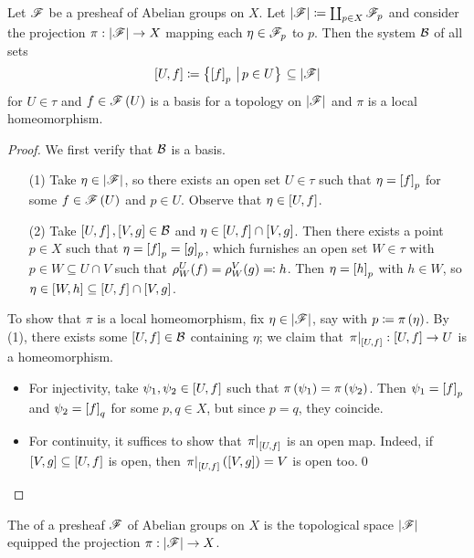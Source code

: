 \documentclass[../Moduli_Spaces_of_Riemann_Surfaces.tex]{subfiles}
\begin{document}
    \begin{proposition}\label{CS:prp:basis_stalk}
        Let $\mathscr{F}$ be a presheaf of Abelian groups on $X$. Let $\left|\mathscr{F}\right|\coloneqq\coprod_{p\in X}\mathscr{F}_p$ and consider the projection $\pi:\left|\mathscr{F}\right|\to X$ mapping each $\eta\in\mathscr{F}_p$ to $p$. Then the system $\mathcal{B}$ of all sets
        \begin{equation*}
            \left[U,f\right]\coloneqq\bigl\{\left[f\right]_p\,\left|\,p\in U\bigr\}\right.\subseteq\left|\mathscr{F}\right|
        \end{equation*}
        for $U\in\tau$ and $f\in\mathscr{F}\left(U\right)$ is a basis for a topology on $\left|\mathscr{F}\right|$ and $\pi$ is a local homeomorphism.
    \end{proposition}
    \begin{proof}
        We first verify that $\mathcal{B}$ is a basis.
        \begin{enumerate}
            \item[(1)] Take $\eta\in\left|\mathscr{F}\right|$, so there exists an open set $U\in\tau$ such that $\eta=\left[f\right]_p$ for some $f\in\mathscr{F}\left(U\right)$ and $p\in U$. Observe that $\eta\in\left[U,f\right]$.
            \item[(2)] Take $\left[U,f\right],\left[V,g\right]\in\mathcal{B}$ and $\eta\in\left[U,f\right]\cap\left[V,g\right]$. Then there exists a point $p\in X$ such that $\eta=\left[f\right]_p=\left[g\right]_p$, which furnishes an open set $W\in\tau$ with $p\in W\subseteq U\cap V$ such that $\rho^U_W\!\left(f\right)=\rho^V_W\!\left(g\right)\eqqcolon h$. Then $\eta=\left[h\right]_p$ with $h\in W$, so $\eta\in\left[W,h\right]\subseteq\left[U,f\right]\cap\left[V,g\right]$.
        \end{enumerate}
        To show that $\pi$ is a local homeomorphism, fix $\eta\in\left|\mathscr{F}\right|$, say with $p\coloneqq\pi\left(\eta\right)$. By (1), there exists some $\left[U,f\right]\in\mathcal{B}$ containing $\eta$; we claim that $\left.\pi\right|_{\left[U,f\right]}:\left[U,f\right]\to U$ is a homeomorphism.
        \begin{itemize}
            \item For injectivity, take $\psi_1,\psi_2\in\left[U,f\right]$ such that $\pi\left(\psi_1\right)=\pi\left(\psi_2\right)$. Then $\psi_1=\left[f\right]_p$ and $\psi_2=\left[f\right]_q$ for some $p,q\in X$, but since $p=q$, they coincide.
            \item For continuity, it suffices to show that $\left.\pi\right|_{\left[U,f\right]}$ is an open map. Indeed, if $\left[V,g\right]\subseteq\left[U,f\right]$ is open, then $\left.\pi\right|_{\left[U,f\right]}\left(\left[V,g\right]\right)=V$ is open too.\qed
        \end{itemize}
    \end{proof}
    \begin{definition}
        The  of a presheaf $\mathscr{F}$ of Abelian groups on $X$ is the topological space $\left|\mathscr{F}\right|$ equipped the projection $\pi:\left|\mathscr{F}\right|\to X$.
    \end{definition}
\end{document}
